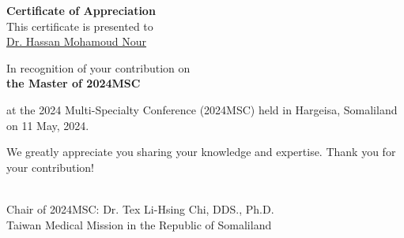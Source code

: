 \documentclass[a4paper, landscape]{article}
\begin{document}
\begin{center}

{\Huge\textbf{Certificate of Appreciation}}\\[0.6cm]

\raisebox{-0.6\height}{}  \hspace{0.3cm}
This certificate is presented to \hspace{0.3cm}
\raisebox{-0.6\height}{} \\[0.4cm]

{\Huge\underline{Dr. Hassan Mohamoud Nour}}\\[0.2cm]



\begin{flushleft}
\Large



\vspace{0.5cm}

In recognition of your contribution on\\

\textbf{the Master of 2024MSC}

\vspace{0.5cm} 

at the 2024 Multi-Specialty Conference (2024MSC) held in Hargeisa, Somaliland on 11 May, 2024.


We greatly appreciate you sharing your knowledge and expertise. Thank you for your contribution!

\end{flushleft}\\[0.5cm]



\large
Chair of 2024MSC: Dr. Tex Li-Hsing Chi, DDS., Ph.D.\\
Taiwan Medical Mission in the Republic of Somaliland

\end{center}



\clearpage
\end{document}
